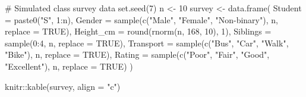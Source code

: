 \documentclass[
  11pt,
  a4paper,
  oneside,
  open=any]{scrbook}
\newenvironment{Shaded}{\begin{snugshade}}{\end{snugshade}}
\newcommand{\AttributeTok}[1]{\textcolor[rgb]{0.40,0.45,0.13}{#1}}
\newcommand{\CommentTok}[1]{\textcolor[rgb]{0.37,0.37,0.37}{#1}}
\newcommand{\ConstantTok}[1]{\textcolor[rgb]{0.56,0.35,0.01}{#1}}
\newcommand{\DecValTok}[1]{\textcolor[rgb]{0.68,0.00,0.00}{#1}}
\newcommand{\FunctionTok}[1]{\textcolor[rgb]{0.28,0.35,0.67}{#1}}
\newcommand{\NormalTok}[1]{\textcolor[rgb]{0.00,0.23,0.31}{#1}}
\newcommand{\OtherTok}[1]{\textcolor[rgb]{0.00,0.23,0.31}{#1}}
\newcommand{\SpecialCharTok}[1]{\textcolor[rgb]{0.37,0.37,0.37}{#1}}
\newcommand{\StringTok}[1]{\textcolor[rgb]{0.13,0.47,0.30}{#1}}
\begin{document}
\begin{Shaded}
\begin{Highlighting}[]
\CommentTok{\# Simulated class survey data}
\FunctionTok{set.seed}\NormalTok{(}\DecValTok{7}\NormalTok{)}
\NormalTok{n }\OtherTok{\textless{}{-}} \DecValTok{10}
\NormalTok{survey }\OtherTok{\textless{}{-}} \FunctionTok{data.frame}\NormalTok{(}
  \AttributeTok{Student   =} \FunctionTok{paste0}\NormalTok{(}\StringTok{"S"}\NormalTok{, }\DecValTok{1}\SpecialCharTok{:}\NormalTok{n),}
  \AttributeTok{Gender    =} \FunctionTok{sample}\NormalTok{(}\FunctionTok{c}\NormalTok{(}\StringTok{"Male"}\NormalTok{, }\StringTok{"Female"}\NormalTok{, }\StringTok{"Non{-}binary"}\NormalTok{), n, }\AttributeTok{replace =} \ConstantTok{TRUE}\NormalTok{),}
  \AttributeTok{Height\_cm =} \FunctionTok{round}\NormalTok{(}\FunctionTok{rnorm}\NormalTok{(n, }\DecValTok{168}\NormalTok{, }\DecValTok{10}\NormalTok{), }\DecValTok{1}\NormalTok{),}
  \AttributeTok{Siblings  =} \FunctionTok{sample}\NormalTok{(}\DecValTok{0}\SpecialCharTok{:}\DecValTok{4}\NormalTok{, n, }\AttributeTok{replace =} \ConstantTok{TRUE}\NormalTok{),}
  \AttributeTok{Transport =} \FunctionTok{sample}\NormalTok{(}\FunctionTok{c}\NormalTok{(}\StringTok{"Bus"}\NormalTok{, }\StringTok{"Car"}\NormalTok{, }\StringTok{"Walk"}\NormalTok{, }\StringTok{"Bike"}\NormalTok{), n, }\AttributeTok{replace =} \ConstantTok{TRUE}\NormalTok{),}
  \AttributeTok{Rating    =} \FunctionTok{sample}\NormalTok{(}\FunctionTok{c}\NormalTok{(}\StringTok{"Poor"}\NormalTok{, }\StringTok{"Fair"}\NormalTok{, }\StringTok{"Good"}\NormalTok{, }\StringTok{"Excellent"}\NormalTok{), n, }\AttributeTok{replace =} \ConstantTok{TRUE}\NormalTok{)}
\NormalTok{)}

\NormalTok{knitr}\SpecialCharTok{::}\FunctionTok{kable}\NormalTok{(survey, }\AttributeTok{align =} \StringTok{"c"}\NormalTok{)}
\end{Highlighting}
\end{Shaded}
\end{document}
